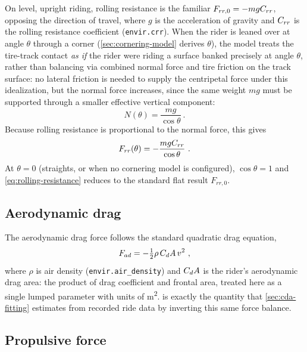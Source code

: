 On level, upright riding, rolling resistance is the familiar
$F_{rr,0} = -m g C_{rr}$, opposing the direction of travel, where $g$ is the
acceleration of gravity and $C_{rr}$ is the rolling resistance coefficient
(\nolinkurl{envir.crr}). When the rider is leaned over at angle $\theta$ through a
corner (\cref{sec:cornering-model} derives $\theta$), the model treats the
tire-track contact \emph{as if} the rider were riding a surface banked
precisely at angle $\theta$, rather than balancing via combined normal
force and tire friction on the track surface: no lateral friction is
needed to supply the centripetal force under this idealization, but the
normal force increases, since the same weight $mg$ must be supported through
a smaller effective vertical component:
\begin{equation}
    N(\theta) = \frac{m g}{\cos\theta}\ .
    \label{eq:normal-force}
\end{equation}
Because rolling resistance is proportional to the normal force, this gives
\begin{equation}
    F_{rr}(\theta) = -\frac{m g C_{rr}}{\cos\theta}\ .
    \label{eq:rolling-resistance}
\end{equation}
At $\theta = 0$ (straights, or when no cornering model is configured),
$\cos\theta = 1$ and \cref{eq:rolling-resistance} reduces to the standard flat
result $F_{rr,0}$.

\subsection{Aerodynamic drag}
\label{sec:aero-drag}

The aerodynamic drag force follows the standard quadratic drag equation,
\begin{equation}
    F_{ad} = -\tfrac{1}{2} \rho \, C_{d}A \, v^2\ ,
    \label{eq:aero-drag}
\end{equation}
where $\rho$ is air density (\nolinkurl{envir.air_density}) and $C_{d}A$ is the
rider's aerodynamic drag area: the product of drag coefficient and frontal area,
treated here as a single lumped parameter with units of \si{\metre\squared}.
\CdA{} is exactly the quantity that \cref{sec:cda-fitting} estimates from
recorded ride data by inverting this same force balance.

\subsection{Propulsive force}
\label{sec:propulsive-force}

